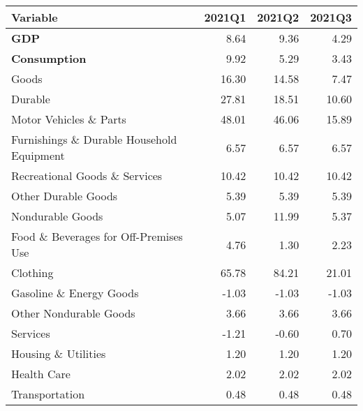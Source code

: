\documentclass[11pt, letterpaper]{article}\usepackage[]{graphicx}\usepackage[]{color}
\begin{document}
\begin{table}[H]
\centering
\begingroup\fontsize{10pt}{12pt}\selectfont
\begin{tabular}{lrrr}
  \hline
Variable & 2021Q1 & 2021Q2 & 2021Q3 \\ 
  \hline
\hspace{0mm} \textbf{GDP} & 8.64 & 9.36 & 4.29 \\ 
  \hspace{0mm} \textbf{Consumption} & 9.92 & 5.29 & 3.43 \\ 
  \hspace{8mm}  Goods & 16.30 & 14.58 & 7.47 \\ 
  \hspace{16mm}  Durable & 27.81 & 18.51 & 10.60 \\ 
  \hspace{24mm}  Motor Vehicles \& Parts & 48.01 & 46.06 & 15.89 \\ 
  \hspace{24mm}  Furnishings \& Durable Household Equipment & 6.57 & 6.57 & 6.57 \\ 
  \hspace{24mm}  Recreational Goods \& Services & 10.42 & 10.42 & 10.42 \\ 
  \hspace{24mm}  Other Durable Goods & 5.39 & 5.39 & 5.39 \\ 
  \hspace{16mm}  Nondurable Goods & 5.07 & 11.99 & 5.37 \\ 
  \hspace{24mm}  Food \& Beverages for Off-Premises Use & 4.76 & 1.30 & 2.23 \\ 
  \hspace{24mm}  Clothing & 65.78 & 84.21 & 21.01 \\ 
  \hspace{24mm}  Gasoline \& Energy Goods & -1.03 & -1.03 & -1.03 \\ 
  \hspace{24mm}  Other Nondurable Goods & 3.66 & 3.66 & 3.66 \\ 
  \hspace{8mm}  Services & -1.21 & -0.60 & 0.70 \\ 
  \hspace{16mm}  Housing \& Utilities & 1.20 & 1.20 & 1.20 \\ 
  \hspace{16mm}  Health Care & 2.02 & 2.02 & 2.02 \\ 
  \hspace{16mm}  Transportation & 0.48 & 0.48 & 0.48 \\ 

\end{tabular}
\end{table}
\end{document}
